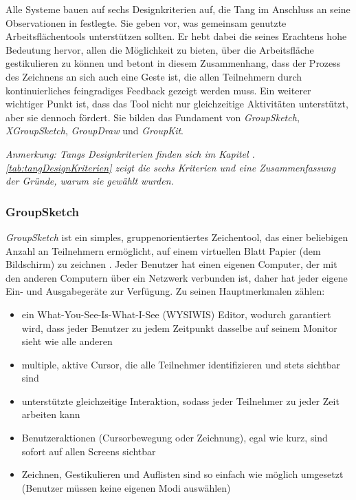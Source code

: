 \medskip Alle Systeme bauen auf sechs Designkriterien auf, die Tang im Anschluss an seine Observationen in \citep{TangJC:1989} festlegte. Sie geben vor, was gemeinsam genutzte Arbeitsflächentools unterstützen sollten. Er hebt dabei die seines Erachtens hohe Bedeutung hervor, allen die Möglichkeit zu bieten, über die Arbeitsfläche gestikulieren zu können und betont in diesem Zusammenhang, dass der Prozess des Zeichnens an sich auch eine Geste ist, die allen Teilnehmern durch kontinuierliches feingradiges Feedback gezeigt werden muss. Ein weiterer wichtiger Punkt ist, dass das Tool nicht nur gleichzeitige Aktivitäten unterstützt, aber sie dennoch fördert.  Sie bilden das Fundament von \emph{GroupSketch}, \emph{XGroupSketch}, \emph{GroupDraw} und \emph{GroupKit}.

\medskip \emph{Anmerkung: \graffito{\(\clubsuit\)} Tangs Designkriterien finden sich im Kapitel . \autoref{tab:tangDesignKriterien} zeigt die sechs Kriterien und eine Zusammenfassung der Gründe, warum sie gewählt wurden.}

\subsubsection{GroupSketch} 
\emph{GroupSketch} ist ein simples, gruppenorientiertes Zeichentool, das einer beliebigen Anzahl an Teilnehmern ermöglicht, auf einem virtuellen Blatt Papier (dem Bildschirm) zu zeichnen \citep{Greenberg:1991}. Jeder Benutzer hat einen eigenen Computer, der mit den anderen Computern über ein Netzwerk verbunden ist, daher hat jeder eigene Ein- und Ausgabegeräte zur Verfügung. Zu seinen Hauptmerkmalen zählen:
\begin{itemize}
	\item{ein What-You-See-Is-What-I-See (WYSIWIS) Editor, wodurch garantiert wird, dass jeder Benutzer zu jedem Zeitpunkt dasselbe auf seinem Monitor sieht wie alle anderen}
	\item{multiple, aktive Cursor, die alle Teilnehmer identifizieren und stets sichtbar sind}
	\item{unterstützte gleichzeitige Interaktion, sodass jeder Teilnehmer zu jeder Zeit arbeiten kann}
	\item{Benutzeraktionen (Cursorbewegung oder Zeichnung), egal wie kurz, sind sofort auf allen Screens sichtbar}
	\item{Zeichnen, Gestikulieren und Auflisten sind so einfach wie möglich umgesetzt (Benutzer müssen keine eigenen Modi auswählen)}
\end{itemize}

